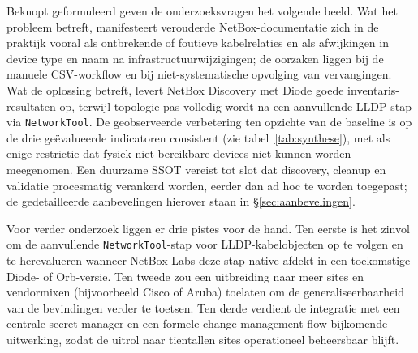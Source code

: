 Beknopt geformuleerd geven de onderzoeksvragen het volgende beeld. Wat het probleem betreft, manifesteert verouderde NetBox-documentatie zich in de praktijk vooral als ontbrekende of foutieve kabelrelaties en als afwijkingen in device type en naam na infrastructuurwijzigingen; de oorzaken liggen bij de manuele CSV-workflow en bij niet-systematische opvolging van vervangingen. Wat de oplossing betreft, levert NetBox Discovery met Diode goede inventaris-resultaten op, terwijl topologie pas volledig wordt na een aanvullende LLDP-stap via \texttt{NetworkTool}. De geobserveerde verbetering ten opzichte van de baseline is op de drie geëvalueerde indicatoren consistent (zie tabel~\ref{tab:synthese}), met als enige restrictie dat fysiek niet-bereikbare devices niet kunnen worden meegenomen. Een duurzame SSOT vereist tot slot dat discovery, cleanup en validatie procesmatig verankerd worden, eerder dan ad hoc te worden toegepast; de gedetailleerde aanbevelingen hierover staan in \S\ref{sec:aanbevelingen}.

Voor verder onderzoek liggen er drie pistes voor de hand. Ten eerste is het zinvol om de aanvullende \texttt{NetworkTool}-stap voor LLDP-kabelobjecten op te volgen en te herevalueren wanneer NetBox Labs deze stap native afdekt in een toekomstige Diode- of Orb-versie. Ten tweede zou een uitbreiding naar meer sites en vendormixen (bijvoorbeeld Cisco of Aruba) toelaten om de generaliseerbaarheid van de bevindingen verder te toetsen. Ten derde verdient de integratie met een centrale secret manager en een formele change-management-flow bijkomende uitwerking, zodat de uitrol naar tientallen sites operationeel beheersbaar blijft.
